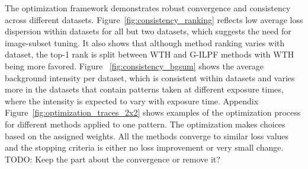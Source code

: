 \documentclass[iucr]{iucrjournals}
\begin{document}
The optimization framework demonstrates robust convergence and consistency across different datasets. Figure~\ref{fig:consistency_ranking} reflects low average loss dispersion within datasets for all but two datasets, which suggests the need for image-subset tuning. It also shows that although method ranking varies with dataset, the top-1 rank is split between WTH and G-ILPF methods with WTH being more favored. Figure ~\ref{fig:consistency_bgsum} shows the average background intensity per dataset, which is consistent within datasets and varies more in the datasets that contain patterns taken at different exposure times, where the intensity is expected to vary with exposure time. Appendix Figure~\ref{fig:optimization_traces_2x2} shows examples of the optimization process for different methods applied to one pattern. The optimization makes choices based on the assigned weights. All the methods converge to similar loss values and the stopping criteria is either no loss improvement or very small change. {\color{red} TODO: Keep the part about the convergence or remove it?}




\end{document}
